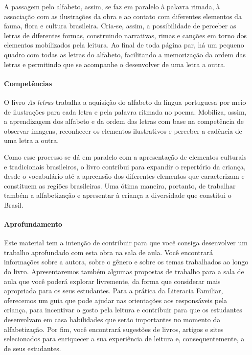 \documentclass[11pt]{extarticle}
\begin{document}
A passagem pelo alfabeto, assim, se faz em paralelo à palavra rimada, à associação com as ilustrações da obra e ao contato com diferentes elementos da fauna, flora e cultura brasileira. Cria-se, assim, a possibilidade de perceber as letras de diferentes formas, construindo narrativas, rimas e canções em torno dos elementos mobilizados pela leitura. Ao final de toda página par, há um pequeno quadro com todas as letras do alfabeto, facilitando a memorização da ordem das letras e permitindo que se acompanhe o desenvolver de uma letra a outra.

\paragraph{Competências}
O livro \textit{As letras} trabalha a aquisição do alfabeto da língua portuguesa por meio de ilustrações para cada letra e pela palavra ritmada no poema. Mobiliza, assim, a aprendizagem dos alfabeto e da ordem das letras com base na competência de observar imagens, reconhecer os elementos ilustrativos e perceber a cadência de uma letra a outra.

Como esse processo se dá em paralelo com a apresentação de elementos culturais e tradicionais brasileiros, o livro contribui para expandir o repertório da criança, desde o vocabulário até a apreensão dos diferentes elementos que caracterizam e constituem as regiões brasileiras. Uma ótima maneira, portanto, de trabalhar também a alfabetização e apresentar à criança a diversidade que constitui o Brasil.


\paragraph{Aprofundamento} Este material tem a 
intenção de contribuir para que você consiga desenvolver um trabalho aprofundado 
com esta obra na sala de aula. Você encontrará informações sobre a autora, sobre 
o gênero e sobre os temas trabalhados ao longo do livro. Apresentaremos também 
algumas propostas de trabalho para a sala de aula que você poderá explorar livremente, 
da forma que considerar mais apropriada para os seus estudantes. Para a prática 
da Literacia Familiar, oferecemos um guia que pode ajudar nas orientações aos 
responsáveis pela criança, para incentivar o gosto pela leitura e contribuir para 
que os estudantes desenvolvam em casa habilidades que serão importantes no momento 
da alfabetização. Por fim, você encontrará sugestões de livros, artigos e sites 
selecionados para enriquecer a sua experiência de leitura e, 
consequentemente, a de seus estudantes.
\end{document}
